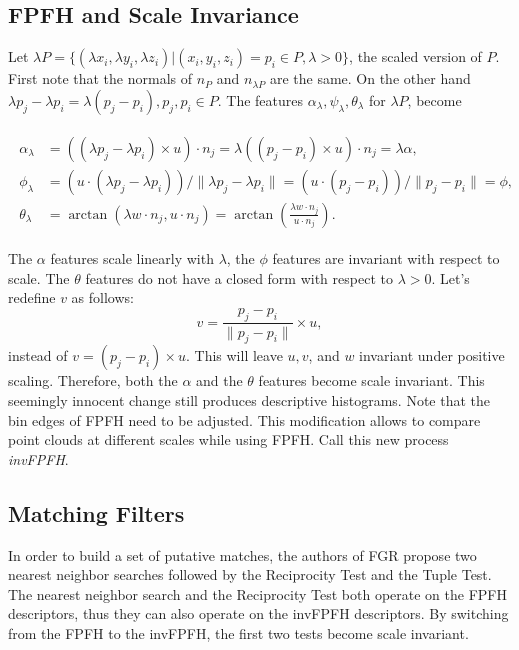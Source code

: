 \documentclass[10pt,a4paper]{article}
\begin{document}
\subsection{FPFH and Scale Invariance}

Let $\lambda P = \{(\lambda x_i, \lambda y_i, \lambda z_i) | (x_i, y_i, z_i) = p_i \in P, \lambda > 0\}$, the scaled version of $P$. First note that the normals of $n_P$ and $n_{\lambda P}$ are the same. On the other hand $\lambda p_j - \lambda p_i = \lambda (p_j - p_i), p_j, p_i \in P$. The features $\alpha_\lambda, \psi_\lambda, \theta_\lambda$ for $\lambda P$, become

\begin{align} 
\begin{split}
\alpha_\lambda &= ((\lambda p_j - \lambda p_i) \times u) \cdot n_j = \lambda ((p_j - p_i) \times u) \cdot n_j = \lambda \alpha, \\
\phi_\lambda &= (u \cdot (\lambda p_j - \lambda p_i))/\|\lambda p_j - \lambda p_i\| = (u \cdot (p_j - p_i))/\|p_j - p_i\| = \phi,\\
\theta_\lambda &= \arctan(\lambda w \cdot n_j , u \cdot n_j) = \arctan\left(\frac{\lambda w \cdot n_j}{u \cdot n_j}\right).
\end{split}
\end{align}

The $\alpha$ features scale linearly with $\lambda$, the $\phi$ features are invariant with respect to scale. The $\theta$ features do not have a closed form with respect to $\lambda > 0$. Let's redefine $v$ as follows:
\[
v = \frac{p_j - p_i}{\|p_j - p_i\|} \times u,
\]
instead of $v = (p_j - p_i) \times u$. This will leave $u,v$, and $w$ invariant under positive scaling. Therefore, both the $\alpha$ and the $\theta$ features become scale invariant. This seemingly innocent change still produces descriptive histograms. Note  that the bin edges of FPFH need to be adjusted. This modification allows to compare point clouds at different scales while using FPFH. Call this new process \textit{invFPFH}. 

\newpage 

\subsection{Matching Filters}

In order to build a set of putative matches, the authors of FGR propose two nearest neighbor searches followed by the Reciprocity Test and the Tuple Test. The nearest neighbor search and the Reciprocity Test both operate on the FPFH descriptors, thus they can also operate on the invFPFH descriptors. By switching from the FPFH to the invFPFH, the first two tests become scale invariant. 
\end{document}
